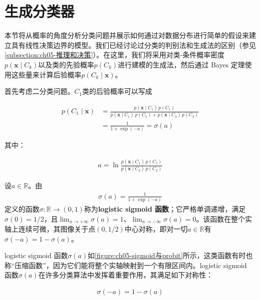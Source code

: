 \documentclass[../../main.tex]{subfiles}
\begin{document}
\section{生成分类器}\label{section:ch05-生成分类器}

本节将从概率的角度分析分类问题并展示如何通过对数据分布进行简单的假设来建立具有线性决策边界的模型。我们已经讨论过分类的判别法和生成法的区别（参见\cref{subsection:ch05-推理和决策}）。在这里，我们将采用对类-条件概率密度$p(\boldsymbol{x}\mid C_k)$以及类的先验概率$p(C_k)$进行建模的生成法，然后通过 Bayes 定理使用这些量来计算后验概率$p(C_k\mid\boldsymbol{x})$。

首先考虑二分类问题。$C_1$类的后验概率可以写成

\begin{align}
  p(C_1\mid\boldsymbol{x})&=\frac{p(\boldsymbol{x}\mid C_1)\,p(C_1)}{p(\boldsymbol{x}\mid C_1)\,p(C_1)+p(\boldsymbol{x}\mid C_2)\,p(C_2)}\nonumber\\
  &=\frac{1}{1+\exp(-a)}=\sigma(a)
  \label{align:ch05-二类后验sigmoid}
\end{align}

其中：

\begin{align}
  a=\ln\frac{p(\boldsymbol{x}\mid C_1)\,p(C_1)}{p(\boldsymbol{x}\mid C_2)\,p(C_2)}
  \label{align:ch05-预激活对数比}
\end{align}

\begin{definition}\label{definition:ch05-logistic-sigmoid}
设$a\in\mathbb{R}$。由
\begin{align}
  \sigma(a)=\frac{1}{1+\exp(-a)}
  \label{align:ch05-sigmoid定义}
\end{align}
定义的函数$\sigma:\mathbb{R}\to(0,1)$称为\textbf{logistic sigmoid 函数}；它严格单调递增，满足$\sigma(0)=1/2$，且$\lim_{a\to+\infty}\sigma(a)=1$、$\lim_{a\to-\infty}\sigma(a)=0$。该函数在整个实轴上连续可微，其图像关于点$(0,1/2)$中心对称，即对一切$a\in\mathbb{R}$有$\sigma(-a)=1-\sigma(a)$。
\end{definition}

logistic sigmoid 函数$\sigma(a)$如\cref{figure:ch05-sigmoid与probit}所示，这类函数有时也称“压缩函数”，因为它们能将整个实轴映射到一个有限区间内。logistic sigmoid 函数$\sigma(a)$在许多分类算法中发挥着重要作用，其满足如下对称性：

\begin{align}
  \sigma(-a)=1-\sigma(a)
  \label{align:ch05-sigmoid对称}
\end{align}
\end{document}
